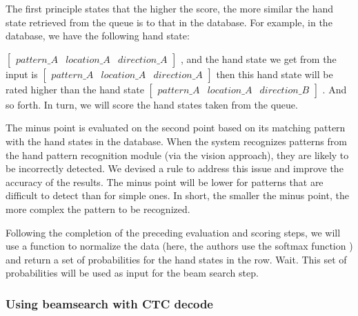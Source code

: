 The first principle states that the higher the score, the more similar the hand state retrieved from the queue is to that in the database. For example, in the database, we have the following hand state:

$\begin{bmatrix}
  pattern \_ A & location \_ A & direction \_ A
\end{bmatrix}$
, and the hand state we get from the input is 
$\begin{bmatrix}
  pattern \_ A & location \_ A & direction \_ A
\end{bmatrix}$
then this hand state will be rated higher than the hand state 
$\begin{bmatrix}
  pattern \_ A & location \_ A & direction \_ B
\end{bmatrix}$
. And so forth. In turn, we will score the hand states taken from the queue.

The minus point is evaluated on the second point based on its matching pattern with the hand states in the database. When the system recognizes patterns from the hand pattern recognition module (via the vision approach), they are likely to be incorrectly detected. We devised a rule to address this issue and improve the accuracy of the results. The minus point will be lower for patterns that are difficult to detect than for simple ones. In short, the smaller the minus point, the more complex the pattern to be recognized.


Following the completion of the preceding evaluation and scoring steps, we will use a function to normalize the data (here, the authors use the softmax function \cite{SoftMax}) and return a set of probabilities for the hand states in the row. Wait. This set of probabilities will be used as input for the beam search step.

\subsubsection{ Using beamsearch with CTC decode }

